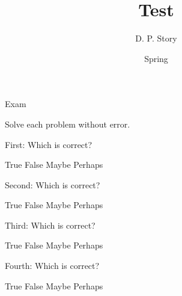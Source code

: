 \documentclass{article}
\title[T\nExam]{Test \nExam}
\author{D. P. Story}
\date{Spring \the\year}
\begin{document}
\maketitle


\begin{exam}{Exam\nExam}

\begin{instructions}
Solve each problem without error.
\end{instructions}


\begin{rtVW}
\begin{problem}[5]
First: Which is correct?
\begin{answers}{4}
\bChoices[nCols=2,random]
     True\eAns
     False\eAns
     Maybe\eAns
     Perhaps\eAns
\eChoices
\end{answers}
\end{problem}
\end{rtVW}

\begin{rtVW}
\begin{problem}[5]
Second: Which is correct?
\begin{answers}{4}
\bChoices[nCols=2,random]
     True\eAns
     False\eAns
     Maybe\eAns
     Perhaps\eAns
\eChoices
\end{answers}
\end{problem}
\end{rtVW}

\begin{rtVW}
\begin{problem}[5]
Third: Which is correct?
\begin{answers}{4}
\bChoices[nCols=2,random]
     True\eAns
     False\eAns
     Maybe\eAns
     Perhaps\eAns
\eChoices
\end{answers}
\end{problem}
\end{rtVW}

\begin{rtVW}
\begin{problem}[5]
Fourth: Which is correct?
\begin{answers}{4}
\bChoices[nCols=2,random]
     True\eAns
     False\eAns
     Maybe\eAns
     Perhaps\eAns
\eChoices
\end{answers}
\end{problem}
\end{rtVW}

\eRTVToks



\end{exam}
\end{document}
